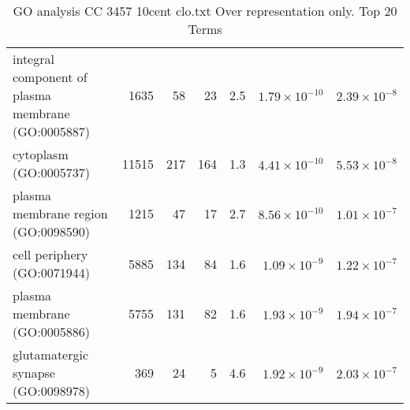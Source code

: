 \begin{table}[ht]
\begin{adjustbox}{width=\textwidth}
\begin{tabular}{lrrrrrr}
  integral component of plasma membrane (GO:0005887) & 1635 & 58 & 23 & 2.5 & $1.79 \times 10^{-10}$ & $2.39 \times 10^{-8}$ \\ 
  cytoplasm (GO:0005737) & 11515 & 217 & 164 & 1.3 & $4.41 \times 10^{-10}$ & $5.53 \times 10^{-8}$ \\ 
  plasma membrane region (GO:0098590) & 1215 & 47 & 17 & 2.7 & $8.56 \times 10^{-10}$ & $1.01 \times 10^{-7}$ \\ 
  cell periphery (GO:0071944) & 5885 & 134 & 84 & 1.6 & $1.09 \times 10^{-9}$ & $1.22 \times 10^{-7}$ \\ 
  plasma membrane (GO:0005886) & 5755 & 131 & 82 & 1.6 & $1.93 \times 10^{-9}$ & $1.94 \times 10^{-7}$ \\ 
  glutamatergic synapse (GO:0098978) & 369 & 24 & 5 & 4.6 & $1.92 \times 10^{-9}$ & $2.03 \times 10^{-7}$ \\ 
   \hline
\end{tabular}
\end{adjustbox}
\caption{GO analysis CC 3457 10cent clo.txt Over representation only. Top 20 Terms} 
\label{tab:GO analysis CC 3457 10cent clo.txt Over representation only. Top 20 Terms}
\end{table}




